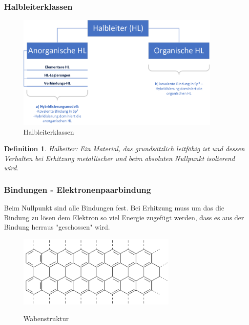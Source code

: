 \documentclass[12pt,a4paper]{report}%
\newtheorem{definition}[satz]{Definition}
\numberwithin{equation}{section}
\numberwithin{equation}{subsection}
\begin{document}
      \subsubsection{Halbleiterklassen}
  		\begin{figure}[H] 
		    \centering
		    \includegraphics[width=0.9\textwidth]{Halbleiterklassen.png}
		    \caption{Halbleiterklassen}
		    \label{fig:halbleiterklassen}
      \end{figure}
		  \begin{definition}
		    Halbeiter: Ein Material, das grundsätzlich leitfähig ist und dessen Verhalten bei Erhitzung metallischer und beim absoluten Nullpunkt isolierend wird.
		  \end{definition}
		  
		  \subsubsection{Bindungen - Elektronenpaarbindung} \label{sss:elpaar}
		  Beim Nullpunkt sind alle Bindungen fest. Bei Erhitzung muss um das die Bindung zu lösen dem Elektron so viel Energie zugefügt werden, dass es aus der Bindung herraus "geschossen" wird.
		  \begin{figure}[H] 
		    \centering
		    \includegraphics[width=0.7\textwidth]{graphen.png}
		    \caption{Wabenstruktur} \cite{waben}
		    \label{fig:wabenstruktur}
      \end{figure}
\newpage
\end{document}
